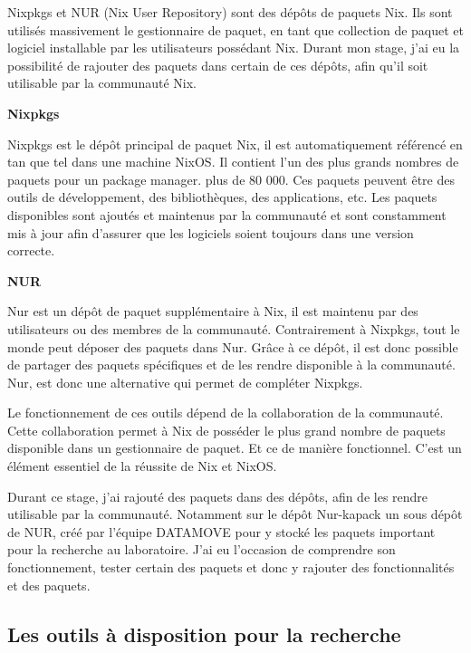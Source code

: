 \documentclass[a4paper,french,12pt, titlepage]{article}
\begin{document}
Nixpkgs et NUR (Nix User Repository) sont des dépôts de paquets Nix. Ils
sont utilisés massivement le gestionnaire de paquet, en tant que
collection de paquet et logiciel installable par les utilisateurs
possédant Nix. Durant mon stage, j'ai eu la possibilité de rajouter des
paquets dans certain de ces dépôts, afin qu'il soit utilisable par la
communauté Nix.\newline

\textbf{Nixpkgs}\newline

Nixpkgs est le dépôt principal de paquet Nix, il est automatiquement
référencé en tan que tel dans une machine NixOS. Il contient l'un des
plus grands nombres de paquets pour un package manager. plus de 80 000.
Ces paquets peuvent être des outils de développement, des bibliothèques,
des applications, etc. Les paquets disponibles sont ajoutés et maintenus
par la communauté et sont constamment mis à jour afin d'assurer que les
logiciels soient toujours dans une version correcte.\newline

\textbf{NUR}\newline

Nur est un dépôt de paquet supplémentaire à Nix, il est maintenu par des
utilisateurs ou des membres de la communauté. Contrairement à Nixpkgs,
tout le monde peut déposer des paquets dans Nur. Grâce à ce dépôt, il
est donc possible de partager des paquets spécifiques et de les rendre
disponible à la communauté. Nur, est donc une alternative qui permet de
compléter Nixpkgs.\newline

Le fonctionnement de ces outils dépend de la collaboration de la
communauté. Cette collaboration permet à Nix de posséder le plus grand
nombre de paquets disponible dans un gestionnaire de paquet. Et ce de
manière fonctionnel. C'est un élément essentiel de la réussite de Nix et
NixOS.\newline

Durant ce stage, j'ai rajouté des paquets dans des dépôts, afin de les
rendre utilisable par la communauté. Notamment sur le dépôt Nur-kapack
un sous dépôt de NUR, créé par l'équipe DATAMOVE pour y stocké les
paquets important pour la recherche au laboratoire. J'ai eu l'occasion
de comprendre son fonctionnement, tester certain des paquets et donc y
rajouter des fonctionnalités et des paquets.

\newpage

\hypertarget{les-outils-uxe0-disposition-pour-la-recherche}{%
\subsection{Les outils à disposition pour la
recherche}\label{les-outils-uxe0-disposition-pour-la-recherche}}
\end{document}
